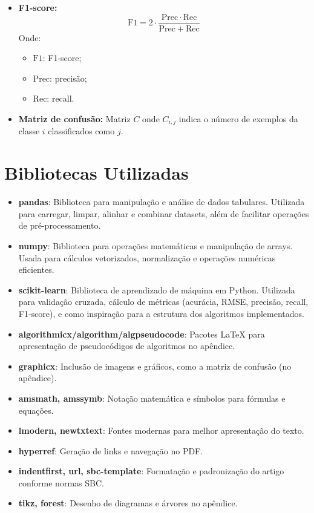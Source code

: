 \documentclass[11pt]{article}
\begin{document}
\begin{itemize}
    \item \textbf{F1-score:}
    \[
    \mathrm{F1} = 2 \cdot \frac{\mathrm{Prec} \cdot \mathrm{Rec}}{\mathrm{Prec} + \mathrm{Rec}}
    \]
    Onde:
    \begin{itemize}
        \item $\mathrm{F1}$: F1-score;
        \item $\mathrm{Prec}$: precisão;
        \item $\mathrm{Rec}$: recall.
    \end{itemize}
    \item \textbf{Matriz de confusão:} Matriz $C$ onde $C_{i,j}$ indica o número de exemplos da classe $i$ classificados como $j$.
\end{itemize}

\section{Bibliotecas Utilizadas}
\begin{itemize}
    \item \textbf{pandas}: Biblioteca para manipulação e análise de dados tabulares. Utilizada para carregar, limpar, alinhar e combinar datasets, além de facilitar operações de pré-processamento.
    \item \textbf{numpy}: Biblioteca para operações matemáticas e manipulação de arrays. Usada para cálculos vetorizados, normalização e operações numéricas eficientes.
    \item \textbf{scikit-learn}: Biblioteca de aprendizado de máquina em Python. Utilizada para validação cruzada, cálculo de métricas (acurácia, RMSE, precisão, recall, F1-score), e como inspiração para a estrutura dos algoritmos implementados.
    \item \textbf{algorithmicx/algorithm/algpseudocode}: Pacotes LaTeX para apresentação de pseudocódigos de algoritmos no apêndice.
    \item \textbf{graphicx}: Inclusão de imagens e gráficos, como a matriz de confusão (no apêndice).
    \item \textbf{amsmath, amssymb}: Notação matemática e símbolos para fórmulas e equações.
    \item \textbf{lmodern, newtxtext}: Fontes modernas para melhor apresentação do texto.
    \item \textbf{hyperref}: Geração de links e navegação no PDF.
    \item \textbf{indentfirst, url, sbc-template}: Formatação e padronização do artigo conforme normas SBC.
    \item \textbf{tikz, forest}: Desenho de diagramas e árvores no apêndice.
\end{itemize}
\end{document}
